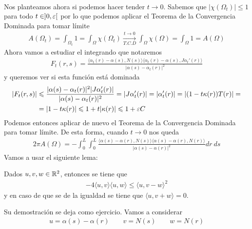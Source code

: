 \begin{observacion}
\begin{enumerate}[start=4]
\begin{align*}
        \end{align*}
        Nos planteamos ahora si podemos hacer tender $t\to 0$. Sabemos que $|\chi(\Omega_t)|\leq 1$ para todo $t\in]0,\varepsilon[$ por lo que podemos aplicar el Teorema de la Convergencia Dominada para tomar límite
        \begin{gather*}
            A(\Omega_t) = \int_{\Omega_t} 1 = \int_\Omega \chi(\Omega_t) \xrightarrow[T.C.D]{t\to 0} \int_\Omega \chi(\Omega) = \int_\Omega 1 = A(\Omega)
        \end{gather*}
        Ahora vamos a estudiar el integrando que notaremos
        \begin{gather*}
            F_t(r,s) = \frac{\langle \alpha_t(r) -\alpha(s), N(s) \rangle \langle \alpha_t(r)-\alpha(s), J \alpha_t'(r)\rangle}{|\alpha(s)-\alpha_t(r)|^2}
        \end{gather*}
        y queremos ver si esta función está dominada
        \begin{align*}
            |F_t(r,s)| &\leqslant
             \frac{|\alpha(s)-\alpha_t(r)|^2|J \alpha_t'(r)|}{|\alpha(s)-\alpha_t(r)|^2} =
             |J\alpha_t'(r)| = |\alpha_t'(r)| = |(1- t \kappa(r))T(r)| =\\
             &=
             |1-t \kappa(r)| \leqslant 1 + t |\kappa(r)| \leqslant 1 + \varepsilon C
        \end{align*}
        Podemos entonces aplicar de nuevo el Teorema de la Convergencia Dominada para tomar límite. De esta forma, cuando $t\to 0$ nos queda
        \begin{gather*}
            2\pi A(\Omega) =
            - \int_0^L \int_0^L \frac{\langle \alpha(s) -\alpha(r), N(s) \rangle \langle \alpha(s)-\alpha(r), N(r)\rangle}{|\alpha(s)-\alpha(r)|^2} dr\ ds
        \end{gather*}
        Vamos a usar el siguiente lema: 
        \begin{lema}
            Dados $u,v,w\in \mathbb{R}^2$, entonces se tiene que 
            \begin{gather*}
                -4\langle u,v\rangle \langle u,w \rangle \leq \langle u,v-w\rangle^2
            \end{gather*}
            y en caso de que se de la igualdad se tiene que $\langle u,v+w \rangle = 0$.
        \end{lema}
        Su demostración se deja como ejercicio. Vamos a considerar 
        \begin{gather*}
            u = \alpha(s) - \alpha(r) \qquad v=N(s) \qquad w=N(r)
        \end{gather*}

\end{enumerate}
\end{observacion}
